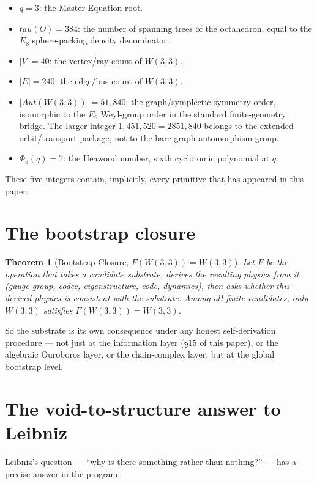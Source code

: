 \documentclass[11pt]{article}
\def\mathrm#1{#1}%
\def\mathcal#1{#1}%
\def\Phi#1{Phi#1}%
\def\tau{tau}%
\def\cdot{ }%
\newtheorem*{theorem}{Theorem}
\begin{document}
\begin{itemize}[leftmargin=2em]
\item $q = 3$: the Master Equation root.
\item $\tau(O) = 384$: the number of spanning trees of the octahedron, equal to the $E_8$ sphere-packing density denominator.
\item $|V| = 40$: the vertex/ray count of $W(3,3)$.
\item $|E| = 240$: the edge/bus count of $W(3,3)$.
\item $|\mathrm{Aut}(W(3,3))| = 51{,}840$: the graph/symplectic symmetry order, isomorphic to the $E_6$ Weyl-group order in the standard finite-geometry bridge. The larger integer $1{,}451{,}520 = 28\cdot 51{,}840$ belongs to the extended orbit/transport package, not to the bare graph automorphism group.
\item $\Phi_6(q) = 7$: the Heawood number, sixth cyclotomic polynomial at $q$.
\end{itemize}

These five integers contain, implicitly, every primitive that has appeared in this paper.

\section{The bootstrap closure}

\begin{theorem}[Bootstrap Closure, $\mathcal{F}(W(3,3)) = W(3,3)$]
Let $\mathcal{F}$ be the operation that takes a candidate substrate, derives the resulting physics from it (gauge group, codec, eigenstructure, code, dynamics), then asks whether this derived physics is consistent with the substrate. Among all finite candidates, only $W(3,3)$ satisfies $\mathcal{F}(W(3,3)) = W(3,3)$.
\end{theorem}

So the substrate is its own consequence under any honest self-derivation procedure --- not just at the information layer (\S15 of this paper), or the algebraic Ouroboros layer, or the chain-complex layer, but at the global bootstrap level.

\section{The void-to-structure answer to Leibniz}

Leibniz's question --- ``why is there something rather than nothing?'' --- has a precise answer in the program:
\end{document}
